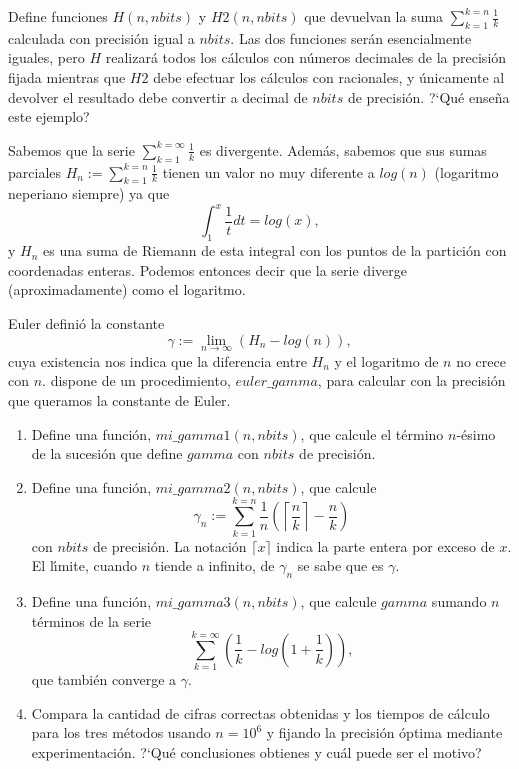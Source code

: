 \begin{ejer}
	
	Define funciones $H(n,nbits)$ y $H2(n,nbits)$ que devuelvan la suma $\sum_{k=1}^{k=n} \frac{1}{k}$ calculada con precisi\'on igual a $nbits$. Las dos funciones ser\'an esencialmente iguales, pero $H$ realizar\'a todos los c\'alculos con n\'umeros decimales de la precisi\'on fijada mientras que $H2$ debe efectuar los c\'alculos con racionales, y \'unicamente al devolver el resultado debe convertir a decimal de $nbits$ de precisi\'on. ?`Qu\'e ense\~na este ejemplo?
	\end{ejer}

\begin{ejer}
	
	Sabemos que la serie $\sum_{k=1}^{k=\infty} \frac{1}{k}$ es divergente. Adem\'as, sabemos que sus sumas parciales $H_n:=\sum_{k=1}^{k=n} \frac{1}{k}$ tienen un valor no muy diferente a $log(n)$ (logaritmo neperiano siempre) ya que
	\[\int_1^x \frac{1}{t}dt=log(x),\]
	y $H_n$ es una suma de Riemann de esta integral con los puntos de la partici\'on con coordenadas enteras. Podemos entonces decir que la serie diverge (aproximadamente) como el logaritmo.
	
	Euler defini\'o la constante
	\[\gamma:=\lim_{n\to \infty}(H_n-log(n)),\]
	\noindent cuya existencia nos indica que la diferencia entre $H_n$ y el logaritmo de $n$ no crece con $n$. {\sage} dispone de un procedimiento, $euler\_gamma$, para calcular con la precisi\'on que queramos la constante de Euler.
	\begin{enumerate}

	\item  Define una funci\'on, $mi\_gamma1(n,nbits)$, que calcule el t\'ermino $n$-\'esimo de la sucesi\'on que define $gamma$ con $nbits$ de precisi\'on.
	\item  Define una funci\'on, $mi\_gamma2(n,nbits)$, que calcule 
	\[\gamma_n:= \sum_{k=1}^{k=n} \frac{1}{n}\left(\left\lceil \frac{n}{k}\right\rceil -\frac{n}{k}\right)\] 
	\noindent con $nbits$ de precisi\'on. La notaci\'on $\lceil x\rceil$ indica la parte entera por exceso de $x$. El l\'{\i}mite, cuando $n$ tiende a infinito, de $\gamma_n$ se sabe que es $\gamma$.
	\item  Define una funci\'on, $mi\_gamma3(n,nbits)$, que calcule $gamma$ sumando $n$ t\'erminos de la serie 
	\[\sum_{k=1}^{k=\infty} \left(\frac{1}{k}-log(1+\frac{1}{k})\right),\] 
	\noindent que tambi\'en converge a $\gamma.$
\item  Compara  la cantidad de cifras correctas obtenidas y los tiempos de c\'alculo para los tres m\'etodos usando $n=10^6$ y  fijando la precisi\'on \'optima mediante experimentaci\'on. ?`Qu\'e conclusiones obtienes y cu\'al puede ser el motivo?
\end{enumerate}
\end{ejer}


